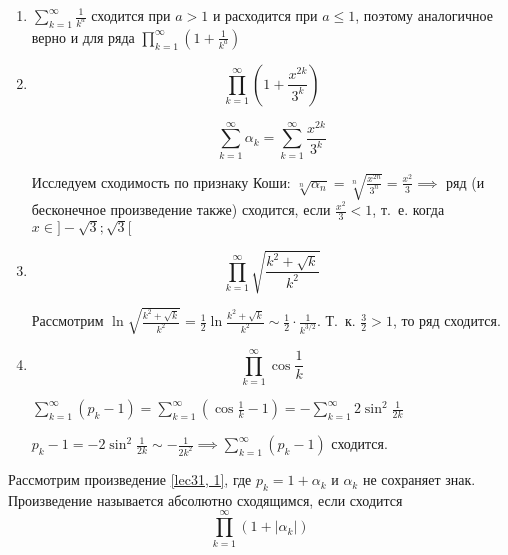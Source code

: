 \documentclass[../../main.tex]{subfiles}
\begin{document}
	\begin{example}
		\begin{enumerate}
			\item $\sum\limits_{k = 1}^{\infty} \frac{1}{k^a}$ сходится при $a > 1$ и расходится при $a \leq 1$, поэтому аналогичное верно и для ряда $\prod\limits_{k = 1}^{\infty} \left(1 + \frac{1}{k^a}\right)$
			
			\item \[\prod\limits_{k = 1}^{\infty} \left(1 + \frac{x^{2k}}{3^k}\right)\]
			
			\[\sum\limits_{k = 1}^{\infty}\alpha_k = \sum\limits_{k = 1}^{\infty} \frac{x^{2k}}{3^k}\]
			
			Исследуем сходимость по признаку Коши: $\sqrt[n]{\alpha_n} = \sqrt[n]{\frac{x^{2n}}{3^n}} = \frac{x^2}{3} \implies$ ряд (и бесконечное произведение также) сходится, если $\frac{x^2}{3} < 1$, т.~е. когда $x \in ]-\sqrt{3}; \sqrt{3}[$
			
			\item \[\prod\limits_{k = 1}^{\infty} \sqrt{\frac{k^2 + \sqrt{k}}{k^2}}\]
			
			Рассмотрим $\ln\sqrt{\frac{k^2 + \sqrt{k}}{k^2}} = \frac{1}{2}\ln\frac{k^2 + \sqrt{k}}{k^2} \sim \frac{1}{2} \cdot \frac{1}{k^{3/2}}$. Т.~к. $\frac{3}{2} > 1$, то ряд сходится.
			
			\item \[\prod\limits_{k = 1}^{\infty} \cos\frac{1}{k}\]
			
			$\sum\limits_{k = 1}^{\infty}(p_k - 1) = \sum\limits_{k = 1}^{\infty} (\cos\frac{1}{k} - 1) = -\sum\limits_{k = 1}^{\infty}2\sin^2\frac{1}{2k}$
			
			$p_k - 1 = -2\sin^2\frac{1}{2k} \sim -\frac{1}{2k^2} \implies \sum\limits_{k = 1}^{\infty}(p_k - 1)$ сходится.
		\end{enumerate}	
	\end{example}

	Рассмотрим произведение \eqref{lec31, 1}, где $p_k = 1 + \alpha_k$ и $\alpha_k$ не сохраняет знак. Произведение называется абсолютно сходящимся, если сходится
	\begin{equation} \label{lec31, 6}
	 \prod\limits_{k = 1}^{\infty} (1 + |\alpha_k|)
	\end{equation}
	
\end{document}
